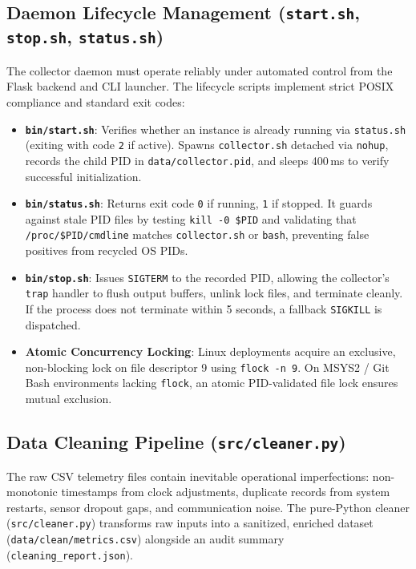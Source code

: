 \subsection{Daemon Lifecycle Management (\texttt{start.sh}, \texttt{stop.sh}, \texttt{status.sh})}
The collector daemon must operate reliably under automated control from the Flask backend and CLI launcher. The lifecycle scripts implement strict POSIX compliance and standard exit codes:
\begin{itemize}
    \item \textbf{\texttt{bin/start.sh}}: Verifies whether an instance is already running via \texttt{status.sh} (exiting with code \texttt{2} if active). Spawns \texttt{collector.sh} detached via \texttt{nohup}, records the child PID in \texttt{data/collector.pid}, and sleeps 400\,ms to verify successful initialization.
    \item \textbf{\texttt{bin/status.sh}}: Returns exit code \texttt{0} if running, \texttt{1} if stopped. It guards against stale PID files by testing \texttt{kill -0 \$PID} and validating that \texttt{/proc/\$PID/cmdline} matches \texttt{collector.sh} or \texttt{bash}, preventing false positives from recycled OS PIDs.
    \item \textbf{\texttt{bin/stop.sh}}: Issues \texttt{SIGTERM} to the recorded PID, allowing the collector's \texttt{trap} handler to flush output buffers, unlink lock files, and terminate cleanly. If the process does not terminate within 5 seconds, a fallback \texttt{SIGKILL} is dispatched.
    \item \textbf{Atomic Concurrency Locking}: Linux deployments acquire an exclusive, non-blocking lock on file descriptor 9 using \texttt{flock -n 9}. On MSYS2 / Git Bash environments lacking \texttt{flock}, an atomic PID-validated file lock ensures mutual exclusion.
\end{itemize}

\subsection{Data Cleaning Pipeline (\texttt{src/cleaner.py})}
The raw CSV telemetry files contain inevitable operational imperfections: non-monotonic timestamps from clock adjustments, duplicate records from system restarts, sensor dropout gaps, and communication noise. The pure-Python cleaner (\texttt{src/cleaner.py}) transforms raw inputs into a sanitized, enriched dataset (\texttt{data/clean/metrics.csv}) alongside an audit summary (\texttt{cleaning\_report.json}).

